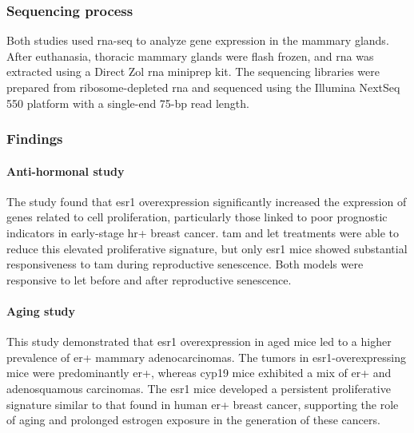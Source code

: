\subsubsection{Sequencing process} \label{sec:dataset_sequencing}
Both studies used \gls{rna-seq} to analyze gene expression in the mammary
glands.
After euthanasia, thoracic mammary glands were flash frozen, and \gls{rna} was
extracted using a Direct Zol \gls{rna} miniprep kit.
The sequencing libraries were prepared from ribosome-depleted \gls{rna} and
sequenced using the Illumina NextSeq 550 platform with a single-end 75-bp read
length\supercite{furth_esr1_2023,furth_overexpression_2023}.

\subsubsection{Findings}

\paragraph{Anti-hormonal study}
The study found that \gls{esr1} overexpression significantly increased the
expression of genes related to cell proliferation, particularly those linked to
poor prognostic indicators in early-stage \gls{hr+} breast cancer.
\Gls{tam} and \gls{let} treatments were able to reduce this elevated
proliferative signature, but only \gls{esr1} mice showed substantial
responsiveness to \gls{tam} during reproductive senescence.
Both models were responsive to \gls{let} before and after reproductive
senescence\supercite{furth_esr1_2023}.

\paragraph{Aging study}
This study demonstrated that \gls{esr1} overexpression in aged mice led to a
higher prevalence of \gls{er+} mammary adenocarcinomas.
The tumors in \gls{esr1}-overexpressing mice were predominantly \gls{er+},
whereas \gls{cyp19} mice exhibited a mix of \gls{er+} and adenosquamous
carcinomas.
The \gls{esr1} mice developed a persistent proliferative signature similar to
that found in human \gls{er+} breast cancer, supporting the role of aging and
prolonged estrogen exposure in the generation of these
cancers\supercite{furth_overexpression_2023}.

